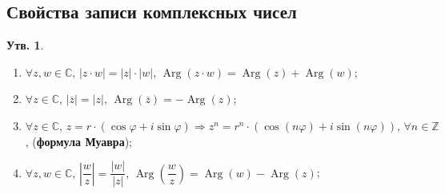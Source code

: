\documentclass[12pt]{article}
\newcommand{\MC}{\mathbb{C}}
\newcommand{\MZ}{\mathbb{Z}}
\theoremstyle{definition}
\newtheorem{prop}{Утв.}
\newcommand{\ovl}[1]{\overline{#1}}
\DeclareMathOperator\Arg{Arg}
\begin{document}
\subsection*{Свойства записи комплексных чисел}
\begin{prop}\hfill
	\begin{enumerate}[label=\arabic*)]
		\item $\forall z,w \in \MC,\, |z{\cdot}w| = |z|{\cdot}|w|, \, \Arg{(z{\cdot}w)} = \Arg(z) + \Arg(w)$;
		\item $\forall z \in \MC, \, |\ovl{z}| = |z|, \, \Arg(\ovl{z}) = -\Arg(z)$;
		\item $\forall z \in \MC, \, z = r{\cdot}(\cos{\varphi} + i\sin{\varphi}) \Rightarrow z^n = r^n{\cdot}(\cos(n\varphi) + i\sin(n\varphi)), \, \forall n \in \MZ$, (\textbf{формула Муавра});
		\item $\forall z,w \in \MC,\, \left|\dfrac{w}{z}\right| = \dfrac{|w|}{|z|}, \, \Arg\left(\dfrac{w}{z}\right) = \Arg(w) - \Arg(z)$;
	\end{enumerate}
\end{prop}
\end{document}
